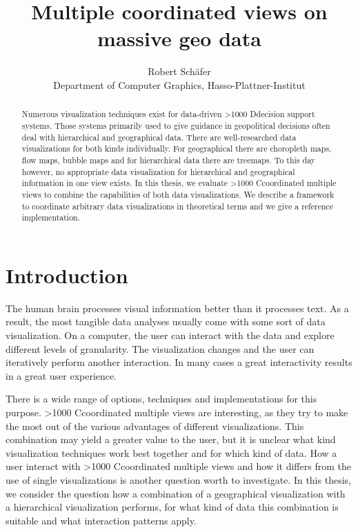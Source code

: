 \documentclass{article}
\newcommand\hmm[1]{\ifnum\ifhmode\spacefactor\else2000\fi>1000 \uppercase{#1}\else#1\fi}
\newcommand{\cmvs}{\hmm{c}oordinated multiple views}
\newcommand{\dss}{\hmm{d}ecision support systems}
\begin{document}
\title{Multiple coordinated views on massive geo data}
\author{Robert Schäfer\\ Department of Computer Graphics, Hasso-Plattner-Institut}
\maketitle
\clearpage

\tableofcontents
\clearpage



\begin{abstract}
  Numerous visualization techniques exist for data-driven \dss{}.
  Those systems primarily used to give guidance in geopolitical decisions often deal with hierarchical and geographical data.
  There are well-researched data visualizations for both kinds individually.
  For geographical there are choropleth maps, flow maps, bubble maps and for hierarchical data there are treemaps.
  To this day however, no appropriate data visualization for hierarchical and geographical information in one view exists.
  In this thesis, we evaluate \cmvs{} to combine the capabilities of both data visualizations.
  We describe a framework to coordinate arbitrary data visualizations in theoretical terms and we give a reference implementation.

\end{abstract}
\clearpage

\section{Introduction}
The human brain processes visual information better than it processes text.
As a result, the most tangible data analyses usually come with some sort of data visualization.
On a computer, the user can interact with the data and explore different levels of granularity.
The visualization changes and the user can iteratively perform another interaction.
In many cases a great interactivity results in a great user experience.

There is a wide range of options, techniques and implementations for this purpose.
\cmvs{} are interesting, as they try to make the most out of the various advantages of different visualizations.
This combination may yield a greater value to the user, but it is unclear what kind visualization techniques work best together and for which kind of data.
How a user interact with \cmvs{} and how it differs from the use of single visualizations is another question worth to investigate.
In this thesis, we consider the question how a combination of a geographical visualization with a hierarchical visualization performs, for what kind of data this combination is suitable and what interaction patterns apply.
\end{document}
